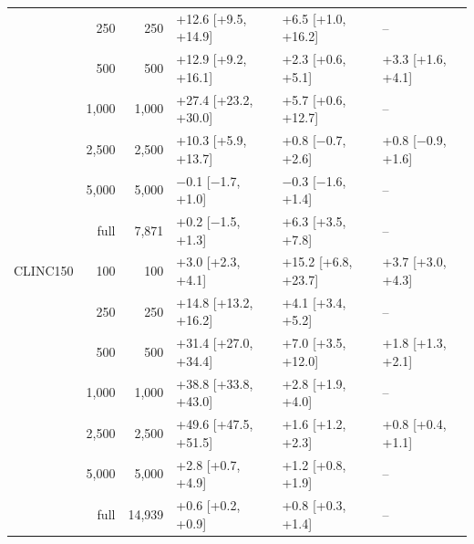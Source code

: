 \begin{tabular}{lrrlll}
 & 250 & 250 & +12.6 [+9.5, +14.9] & +6.5 [+1.0, +16.2] & -- \\
 & 500 & 500 & +12.9 [+9.2, +16.1] & +2.3 [+0.6, +5.1] & +3.3 [+1.6, +4.1] \\
 & 1{,}000 & 1{,}000 & +27.4 [+23.2, +30.0] & +5.7 [+0.6, +12.7] & -- \\
 & 2{,}500 & 2{,}500 & +10.3 [+5.9, +13.7] & +0.8 [$-$0.7, +2.6] & +0.8 [$-$0.9, +1.6] \\
 & 5{,}000 & 5{,}000 & $-$0.1 [$-$1.7, +1.0] & $-$0.3 [$-$1.6, +1.4] & -- \\
 & full & 7{,}871 & +0.2 [$-$1.5, +1.3] & +6.3 [+3.5, +7.8] & -- \\
\midrule
CLINC150 & 100 & 100 & +3.0 [+2.3, +4.1] & +15.2 [+6.8, +23.7] & +3.7 [+3.0, +4.3] \\
 & 250 & 250 & +14.8 [+13.2, +16.2] & +4.1 [+3.4, +5.2] & -- \\
 & 500 & 500 & +31.4 [+27.0, +34.4] & +7.0 [+3.5, +12.0] & +1.8 [+1.3, +2.1] \\
 & 1{,}000 & 1{,}000 & +38.8 [+33.8, +43.0] & +2.8 [+1.9, +4.0] & -- \\
 & 2{,}500 & 2{,}500 & +49.6 [+47.5, +51.5] & +1.6 [+1.2, +2.3] & +0.8 [+0.4, +1.1] \\
 & 5{,}000 & 5{,}000 & +2.8 [+0.7, +4.9] & +1.2 [+0.8, +1.9] & -- \\
 & full & 14{,}939 & +0.6 [+0.2, +0.9] & +0.8 [+0.3, +1.4] & -- \\
\bottomrule
\end{tabular}

